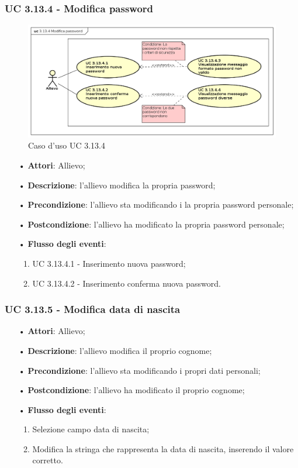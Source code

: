 \subsubsection{UC 3.13.4 - Modifica password}
\begin{figure}[H]
	\centering
	\includegraphics[width=15cm, keepaspectratio]{img/UC3134.png} 
	\caption{Caso d'uso UC 3.13.4}\label{fig:3134}
\end{figure}
\begin{itemize}
	\item[•]\textbf{Attori}: Allievo;
	\item[•]\textbf{Descrizione}: l'allievo modifica la propria password;
	\item[•]\textbf{Precondizione}: l'allievo sta modificando i la propria password personale;
	\item[•]\textbf{Postcondizione}: l'allievo ha modificato la propria password personale; 
	\item[•]\textbf{Flusso degli eventi}: 
	\begin{enumerate}
		\item UC 3.13.4.1 - Inserimento nuova password;
		\item UC 3.13.4.2 - Inserimento conferma nuova password.
	\end{enumerate}
\end{itemize}
\subsubsection{UC 3.13.5 - Modifica data di nascita}
\begin{itemize}
	\item[•]\textbf{Attori}: Allievo;
	\item[•]\textbf{Descrizione}: l'allievo modifica il proprio cognome;
	\item[•]\textbf{Precondizione}: l'allievo sta modificando i propri dati personali;
	\item[•]\textbf{Postcondizione}: l'allievo ha modificato il proprio cognome; 
	\item[•]\textbf{Flusso degli eventi}: 
	\begin{enumerate}
		\item Selezione campo data di nascita;
		\item Modifica la stringa che rappresenta la data di nascita, inserendo il valore corretto.
	\end{enumerate}
\end{itemize}
